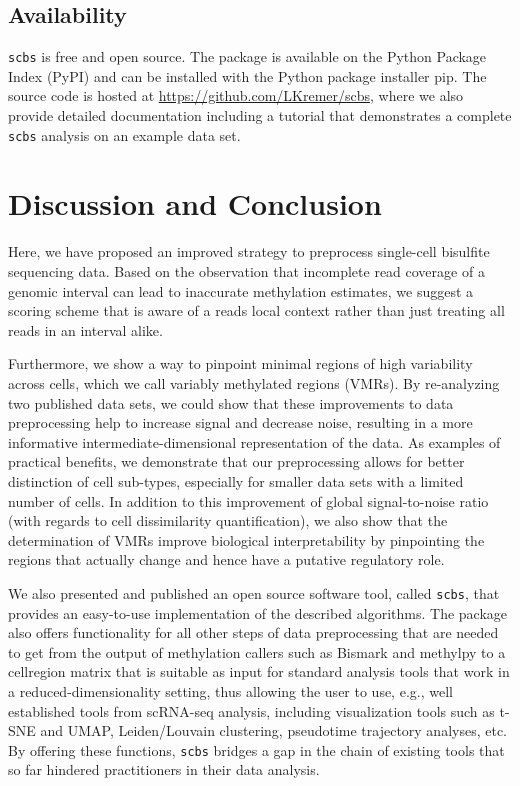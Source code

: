 \documentclass[twocolumn,10pt]{article}
\begin{document}
\subsection{Availability}

\texttt{scbs} is free and open source.
The package is available on the Python Package Index (PyPI) and can be installed with the Python package installer pip.
The source code is hosted at \href{https://github.com/LKremer/scbs}{https://github.com/LKremer/scbs}, where we also provide detailed documentation including a tutorial that demonstrates a complete \texttt{scbs} analysis on an example data set.




\section{Discussion and Conclusion}

Here, we have proposed an improved strategy to preprocess single-cell bisulfite sequencing data.
Based on the observation that incomplete read coverage of a genomic interval can lead to inaccurate methylation estimates, we suggest a scoring scheme that is aware of a reads local context rather than just treating all reads in an interval alike.

Furthermore, we show a way to pinpoint minimal regions of high variability across cells, which we call variably methylated regions (VMRs).
By re-analyzing two published data sets, we could show that these improvements to data preprocessing help to increase signal and decrease noise, resulting in a more informative intermediate-dimensional representation of the data.
As examples of practical benefits, we demonstrate that our preprocessing allows for better distinction of cell sub-types, especially for smaller data sets with a limited number of cells.
In addition to this improvement of global signal-to-noise ratio (with regards to cell dissimilarity quantification), we also show that the determination of VMRs improve biological interpretability by pinpointing the regions that actually change and hence have a putative regulatory role.

We also presented and published an open source software tool, called \texttt{scbs}, that provides an easy-to-use implementation of the described algorithms.
The package also offers functionality for all other steps of data preprocessing that are needed to get from the output of methylation callers such as Bismark and methylpy to a cell\texttimes region matrix that is suitable as input for standard analysis tools that work in a reduced-dimensionality setting, thus allowing the user to use, e.g., well established tools from scRNA-seq analysis, including visualization tools such as t-SNE and UMAP, Leiden/Louvain clustering, pseudotime trajectory analyses, etc.
By offering these functions, \texttt{scbs} bridges a gap in the chain of existing tools that so far hindered practitioners in their data analysis.
\end{document}
